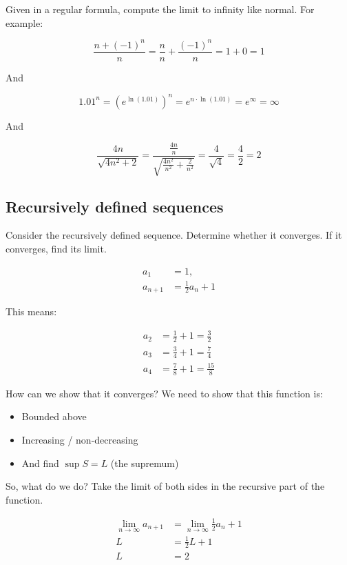 \documentclass[12pt]{article}
\theoremstyle{plain}
\theoremstyle{remark}
\theoremstyle{definition}
\begin{document}
Given in a regular formula, compute the limit to infinity like normal.
For example:

\[\frac{n + ( - 1)^{n}}{n} = \frac{n}{n} + \frac{( - 1)^{n}}{n} = 1 + 0 = 1\]

And

\[{1.01}^{n} = \left( e^{\ln(1.01)} \right)^{n} = e^{n \cdot \ln(1.01)} = e^{\infty} = \infty\]

And

\[\frac{4n}{\sqrt{4n^{2} + 2}} = \frac{\frac{4n}{n}}{\sqrt{\frac{4n^{2}}{n^{2}} + \frac{2}{n^{2}}}} = \frac{4}{\sqrt{4}} = \frac{4}{2} = 2\]


\subsection{Recursively defined
sequences}

Consider the recursively defined sequence. Determine whether it
converges. If it converges, find its limit.

\begin{align*}
a_{1} &= 1, \\
a_{n + 1} &= \frac{1}{2}a_{n} + 1
\end{align*}


This means:

\begin{align*}
a_{2} &= \frac{1}{2} + 1 = \frac{3}{2} \\
a_{3} &= \frac{3}{4} + 1 = \frac{7}{4} \\
a_{4} &= \frac{7}{8} + 1 = \frac{15}{8}
\end{align*}


How can we show that it converges? We need to show that this function
is:

\begin{itemize}
\item
  Bounded above
\item
  Increasing / non-decreasing
\item
  And find \(\sup S = L\) (the supremum)
\end{itemize}

So, what do we do? Take the limit of both sides in the recursive part of
the function.

\begin{align*}
\lim_{n \rightarrow \infty}a_{n + 1} &= \lim_{n \rightarrow \infty}{\frac{1}{2}a_{n} + 1} \\
L &= \frac{1}{2}L + 1 \\
L &= 2
\end{align*}
\end{document}
